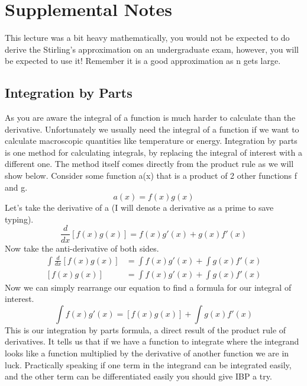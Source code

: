 \documentclass{article}
\begin{document}
\section{Supplemental Notes}
This lecture was a bit heavy mathematically, you would not be expected to do derive the Stirling's approximation on an undergraduate exam, however, you will be expected to use it!
Remember it is a good approximation as n gets large. 
\subsection*{Integration by Parts}
As you are aware the integral of a function is much harder to calculate than the derivative. 
Unfortunately we usually need the integral of a function if we want to calculate macroscopic quantities like temperature or energy.
Integration by parts is one method for calculating integrals, by replacing the integral of interest with a different one. 
The method itself comes directly from the product rule as we will show below. 
Consider some function a(x) that is a product of 2 other functions f and g.  
\begin{equation}
    a(x) = f(x)g(x)
\end{equation}
Let's take the derivative of a (I will denote a derivative as a prime to save typing).
\begin{equation}
    \frac{d}{dx}\left[f(x)g(x)\right] = f(x)g'(x) + g(x)f'(x)
\end{equation}
Now take the anti-derivative of both sides. 
\begin{equation}
    \begin{split}
        \int\frac{d}{dx}\left[f(x)g(x)\right] &= \int f(x)g'(x) + \int g(x)f'(x) \\
         \left[f(x)g(x)\right] &= \int f(x)g'(x) + \int g(x)f'(x) 
    \end{split}
\end{equation}
Now we can simply rearrange our equation to find a formula for our integral of interest. 
\begin{equation}
    \int f(x)g'(x) =  \left[f(x)g(x)\right] + \int g(x)f'(x) 
\end{equation}
This is our integration by parts formula, a direct result of the product rule of derivatives. 
It tells us that if we have a function to integrate where the integrand looks like a function multiplied by the derivative of another function we are in luck. 
Practically speaking if one term in the integrand can be integrated easily, and the other term can be differentiated easily you should give IBP a try. 
\end{document}
